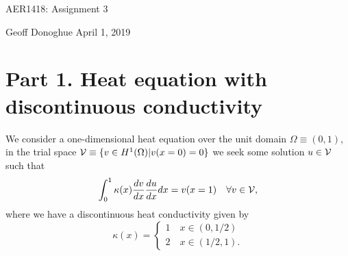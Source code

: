 \documentclass{article}
\begin{document}
\Large\centering AER1418: Assignment 3\\
\normalsize\raggedright Geoff Donoghue \hfill April 1, 2019\\

\section*{Part 1. Heat equation with discontinuous conductivity}
We consider a one-dimensional heat equation over the unit domain \(\Omega \equiv (0,1) \), in the trial space \(\mathcal{V} \equiv \{v \in H^1(\Omega) | v(x=0) = 0 \} \) we seek some solution \(u \in \mathcal{V} \) such that
\begin{equation*}
	\int_0^1 \kappa(x) \frac{d v}{d x}\frac{d u}{d x}dx = v(x=1) \quad \forall v \in \mathcal{V},
\end{equation*}
where we have a discontinuous heat conductivity given by
\begin{equation*}
	\kappa(x) = 
	\begin{cases}
	1\quad x \in (0,1/2)\\
	2\quad x \in (1/2,1).
	\end{cases}
\end{equation*}
\end{document}
